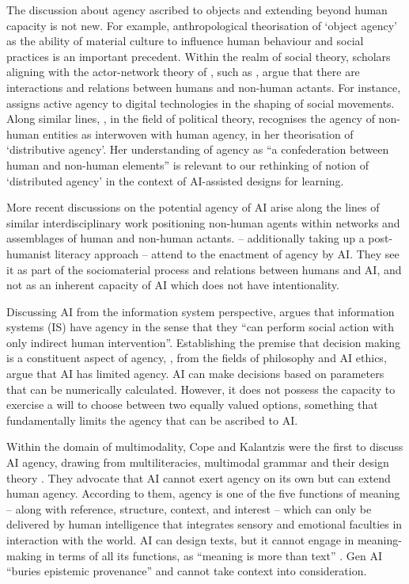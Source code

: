 \documentclass[english]{textolivre}
\begin{document}
The discussion about agency ascribed to objects and extending beyond human capacity is not new. For example,  anthropological theorisation of ‘object agency’ as the ability of material culture to influence human behaviour and social practices is an important precedent. Within the realm of social theory, scholars aligning with the actor-network theory of \textcite{latour2005reassembling}, such as \textcite{tufekci2015algorithmic,bennett2010vibrant}, argue that there are interactions and relations between humans and non-human actants. For instance, \textcite{tufekci2015algorithmic} assigns active agency to digital technologies in the shaping of social movements. Along similar lines, \textcite{bennett2010vibrant}, in the field of political theory, recognises the agency of non-human entities as interwoven with human agency, in her theorisation of ‘distributive agency’. Her understanding of agency as “a confederation between human and non-human elements” \cite[p. 21]{bennett2010vibrant} is relevant to our rethinking of  notion of ‘distributed agency’ in the context of AI-assisted designs for learning.

More recent discussions on the potential agency of AI arise along the lines of similar interdisciplinary work positioning non-human agents within networks and assemblages of human and non-human actants. \textcite{burriss2024critical} – additionally taking up a post-humanist literacy approach – attend to the enactment of agency by AI. They see it as part of the sociomaterial process and relations between humans and AI, and not as an inherent capacity of AI which does not have intentionality.

Discussing AI from the information system perspective, \textcite[p. 3]{agerfalk2020artificial} argues that information systems (IS) have agency in the sense that they “can perform social action with only indirect human intervention”. Establishing the premise that decision making is a constituent aspect of agency, \textcite{swanepoel2024agency}, from the fields of philosophy and AI ethics, argue that AI has limited agency. AI can make decisions based on parameters that can be numerically calculated. However, it does not possess the capacity to exercise a will to choose between two equally valued options, something that fundamentally limits the agency that can be ascribed to AI.

Within the domain of multimodality, Cope and Kalantzis were the first to discuss AI agency, drawing from multiliteracies, multimodal grammar and their design theory \cite{cope2022artificial,cope2024a_multimodal}. They advocate that AI cannot exert agency on its own but can extend human agency. According to them, agency is one of the five functions of meaning – along with reference, structure, context, and interest – which can only be delivered by human intelligence that integrates sensory and emotional faculties in interaction with the world. AI can design texts, but it cannot engage in meaning-making in terms of all its functions, as “meaning is more than text” \cite[p. 146]{cope2024a_multimodal}. Gen AI “buries epistemic provenance” \cite[p. 6]{cope2024a_multimodal} and cannot take context into consideration.
\end{document}
